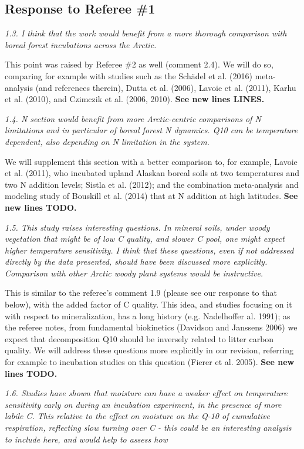 \documentclass[11pt, oneside]{article}
\begin{document}
\subsection*{Response to Referee \#1}

{\it 1.3. I think that the work would benefit from a more thorough comparison with boreal forest incubations across the Arctic. }

This point was raised by Referee \#2 as well (comment 2.4). We will do so, comparing for example with studies such as the Schädel et al. (2016) meta-analysis (and references therein), Dutta et al. (2006), Lavoie et al. (2011), Karhu et al. (2010), and Czimczik et al. (2006, 2010). {\bf See new lines LINES.}

\medskip
{\it 1.4. N section would benefit from more Arctic-centric comparisons of N limitations and in particular of boreal forest N dynamics. Q10 can be temperature dependent, also depending on N limitation in the system. }

We will supplement this section with a better comparison to, for example, Lavoie et al. (2011), who incubated upland Alaskan boreal soils at two temperatures and two N addition levels; Sistla et al. (2012); and the combination meta-analysis and modeling study of Bouskill et al. (2014) that at N addition at high latitudes. {\bf See new lines TODO.}

\medskip
{\it 1.5. This study raises interesting questions. In mineral soils, under woody vegetation that might be of low C quality, and slower C pool, one might expect higher temperature sensitivity. I think that these questions, even if not addressed directly by the data presented, should have been discussed more explicitly. Comparison with other Arctic woody plant systems would be instructive. }

This is similar to the referee's comment 1.9 (please see our response to that below), with the added factor of C quality. This idea, and studies focusing on it with respect to mineralization, has a long history (e.g. Nadelhoffer al. 1991); as the referee notes, from fundamental biokinetics (Davidson and Janssens 2006) we expect that decomposition Q10 should be inversely related to litter carbon quality. We will address these questions more explicitly in our revision, referring for example to incubation studies on this question (Fierer et al. 2005). {\bf See new lines TODO.}

\medskip
{\it 1.6. Studies have shown that moisture can have a weaker effect on temperature sensitivity early on during an incubation experiment, in the presence of more labile C. This relative to the effect on moisture on the Q-10 of cumulative respiration, reflecting slow turning over C - this could be an interesting analysis to include here, and would help to assess how }
\end{document}
